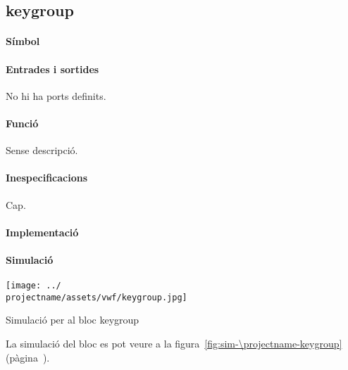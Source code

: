 \subsection{\label{sub:\projectname-keygroup} \textsf{keygroup}}

\paragraph{Símbol}

\begin{center}  \end{center}

\paragraph{Entrades i sortides}

No hi ha ports definits.

\paragraph{Funció}

Sense descripció.

\paragraph{Inespecificacions}

Cap.

\paragraph{Implementació}





\paragraph{Simulació}

\begin{contendfig}
  \begin{center}
    \texttt{[image: ../\\projectname/assets/vwf/keygroup.jpg]}
  \end{center}
  \caption{\label{fig:sim-\projectname-keygroup} Simulació per al bloc \textsf{keygroup}}
\end{contendfig}

La simulació del bloc es pot veure a la figura~\ref{fig:sim-\projectname-keygroup} (pàgina~\pageref{fig:sim-\projectname-keygroup}).


\vspace{1cm}
